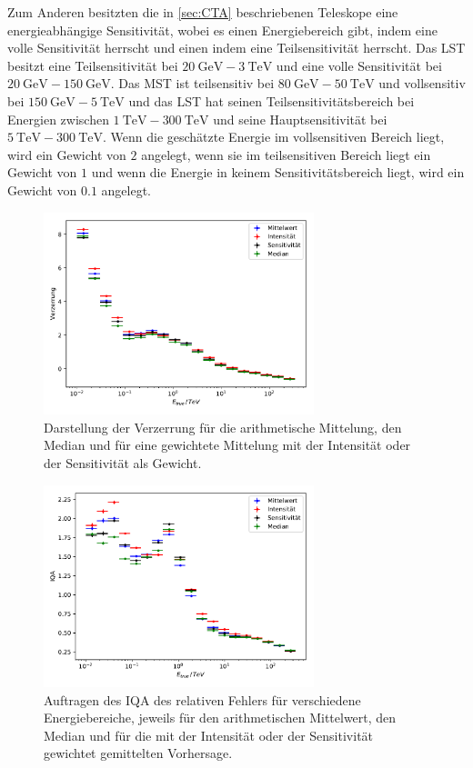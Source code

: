 Zum Anderen besitzten die in \autoref{sec:CTA} beschriebenen Teleskope eine energieabhängige Sensitivität, wobei
es einen Energiebereich gibt, indem eine volle Sensitivität herrscht und einen indem eine Teilsensitivität
herrscht.
Das LST besitzt eine Teilsensitivität bei $\SI{20}{\giga\eV}-\SI{3}{\tera\eV}$ und eine volle Sensitivität bei
$\SI{20}{\giga\eV}-\SI{150}{\giga\eV}$.
Das MST ist teilsensitiv bei $\SI{80}{\giga\eV}-\SI{50}{\tera\eV}$ und vollsensitiv bei $\SI{150}{\giga\eV}-\SI{5}{\tera\eV}$
und das LST hat seinen Teilsensitivitätsbereich bei Energien zwischen $\SI{1}{\tera\eV}-\SI{300}{\tera\eV}$ und seine
Hauptsensitivität bei $\SI{5}{\tera\eV}-\SI{300}{\tera\eV}$.\cite{CTA_tec}
Wenn die geschätzte Energie im vollsensitiven Bereich liegt, wird ein Gewicht von $2$ angelegt, wenn sie im
teilsensitiven Bereich liegt ein Gewicht von $1$ und wenn die Energie in keinem Sensitivitätsbereich liegt,
wird ein Gewicht von $0.1$ angelegt.
\begin{figure}
  \includegraphics[width=0.7\textwidth]{Plots/RF_weights_bias.pdf}
  \centering
  \caption{Darstellung der Verzerrung für die arithmetische Mittelung, den Median und für eine gewichtete Mittelung mit der Intensität
            oder der Sensitivität als Gewicht.}
  \label{abb:w_bias}
\end{figure}
\begin{figure}
  \includegraphics[width=0.7\textwidth]{Plots/RF_weights_resolution.pdf}
  \centering
  \caption{Auftragen des IQA des relativen Fehlers für verschiedene Energiebereiche, jeweils für den arithmetischen Mittelwert, den Median und
            für die mit der Intensität oder der Sensitivität gewichtet gemittelten Vorhersage.}
  \label{abb:w_IQA}
\end{figure}

